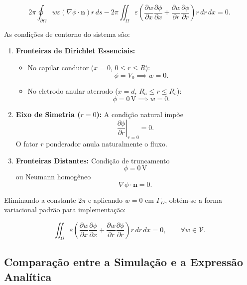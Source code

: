 \documentclass[12pt,a4paper]{article}
\begin{document}
\begin{equation}
2\pi
\oint_{\partial\Omega}
w\varepsilon
\left(
\nabla\phi\cdot\mathbf{n}
\right)
r\,ds
-
2\pi
\iint_{\Omega}
\varepsilon
\left(
\frac{\partial w}{\partial x}
\frac{\partial\phi}{\partial x}
+
\frac{\partial w}{\partial r}
\frac{\partial\phi}{\partial r}
\right)
r\,dr\,dx
=
0.
\end{equation}

As condições de contorno do sistema são:

\begin{enumerate}
    \item \textbf{Fronteiras de Dirichlet Essenciais:}
    \begin{itemize}
        \item No capilar condutor
        ($x=0$, $0\leq r\leq R$):
        \[
        \phi=V_0
        \implies
        w=0.
        \]

        \item No eletrodo anular aterrado
        ($x=d$, $R_a\leq r\leq R_b$):
        \[
        \phi=0\,\text{V}
        \implies
        w=0.
        \]
    \end{itemize}

    \item \textbf{Eixo de Simetria ($r=0$):}
    A condição natural impõe
    \[
    \left.
    \frac{\partial\phi}{\partial r}
    \right|_{r=0}
    =
    0.
    \]
    O fator $r$ ponderador anula naturalmente o fluxo.

    \item \textbf{Fronteiras Distantes:}
    Condição de truncamento
    \[
    \phi=0\,\text{V}
    \]
    ou Neumann homogêneo
    \[
    \nabla\phi\cdot\mathbf{n}=0.
    \]
\end{enumerate}

Eliminando a constante $2\pi$ e aplicando $w=0$ em $\Gamma_D$, obtém-se a forma
variacional padrão para implementação:

\begin{equation}
\iint_{\Omega}
\varepsilon
\left(
\frac{\partial w}{\partial x}
\frac{\partial\phi}{\partial x}
+
\frac{\partial w}{\partial r}
\frac{\partial\phi}{\partial r}
\right)
r\,dr\,dx
=
0,
\qquad
\forall w\in\mathcal{V}.
\end{equation}

\subsection{Comparação entre a Simulação e a Expressão Analítica}
\end{document}
